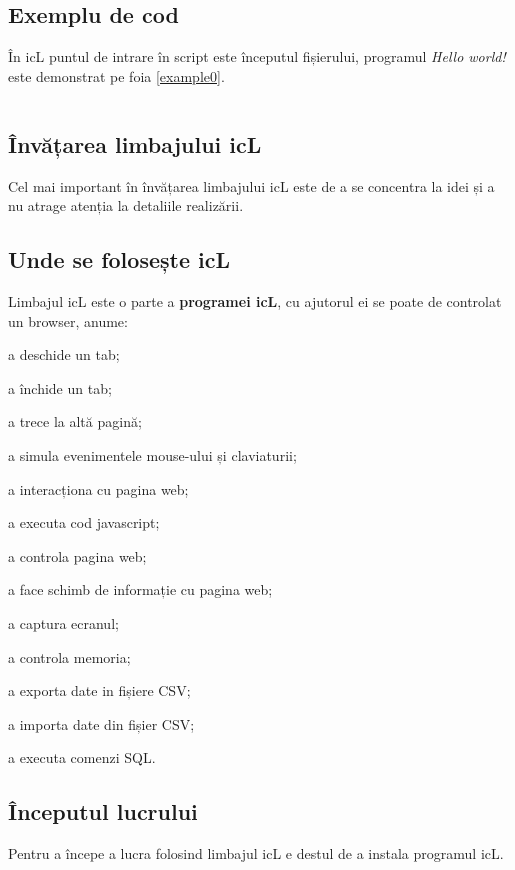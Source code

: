 \subsection{Exemplu de cod}

În icL puntul de intrare în script este începutul fișierului, programul \textit{Hello world!} este demonstrat pe foia \ref{example0}.

\begin{listing}
\label{example0}
\inputminted[linenos]{icl}{../sources/helloworld.icL}
\end{listing}

\subsection{Învățarea limbajului icL}

Cel mai important în învățarea limbajului icL este de a se concentra la idei și a nu atrage atenția la detaliile realizării.

\subsection{Unde se folosește icL}

Limbajul icL este o parte a \textbf{programei icL}, cu ajutorul ei se poate de controlat un browser, anume:
\begin{icItems}
\item
	a deschide un tab;
\item
	a închide un tab;
\item
	a trece la altă pagină;
\item
	a simula evenimentele mouse-ului și claviaturii;
\item
	a interacționa cu pagina web;
\item
	a executa cod javascript;
\item
	a controla pagina web;
\item
	a face schimb de informație cu pagina web;
\item
	a captura ecranul;
\item
	a controla memoria;
\item
	a exporta date in fișiere CSV;
\item
	a importa date din fișier CSV;
\item
	a executa comenzi SQL.
\end{icItems}

\subsection{Începutul lucrului}

Pentru a începe a lucra folosind limbajul icL e destul de a instala programul icL.
